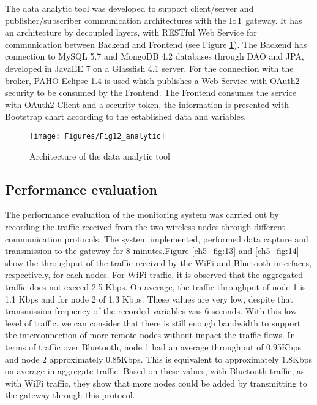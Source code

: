 The data analytic tool was developed to support client/server and publisher/subscriber communication architectures with the IoT gateway. It has an architecture by decoupled layers, with RESTful Web Service for communication between Backend and Frontend (see Figure \ref{ch5_fig:12}). The Backend has connection to MySQL 5.7 and MongoDB 4.2 databases through DAO and JPA, developed in JavaEE 7 on a Glassfish 4.1 server. For the connection with the broker, PAHO Eclipse 1.4 is used which publishes a Web Service with OAuth2 security to be consumed by the Frontend. The Frontend consumes the service with OAuth2 Client and a security token, the information is presented with Bootstrap chart according to the established data and variables.

\begin{figure}[ht!]
\centering
\texttt{[image: Figures/Fig12\_analytic]}
\caption{Architecture of the data analytic tool}
\label{ch5_fig:12}       %
\end{figure}

\subsection{Performance evaluation}

The performance evaluation of the monitoring system was carried out by recording the traffic received from the two wireless nodes through different communication protocols. The system implemented, performed data capture and transmission to the gateway for 8 minutes.Figure \ref{ch5_fig:13} and \ref{ch5_fig:14} show the throughput of the traffic received by the WiFi and Bluetooth interfaces, respectively, for each nodes. For WiFi traffic, it is observed that the aggregated traffic does not exceed 2.5 Kbps. On average, the traffic throughput of node 1 is 1.1 Kbps and for node 2 of 1.3 Kbps. These values are very low, despite that transmission frequency of the recorded variables was 6 seconds. With this low level of traffic, we can consider that there is still enough bandwidth to support the interconnection of more remote nodes without impact the traffic flows. In terms of traffic over Bluetooth, node 1 had an average throughput of 0.95Kbps and node 2 approximately 0.85Kbps. This is equivalent to approximately 1.8Kbps on average in aggregate traffic. Based on these values, with Bluetooth traffic, as with WiFi traffic, they show that more nodes could be added by transmitting to the gateway through this protocol. 

